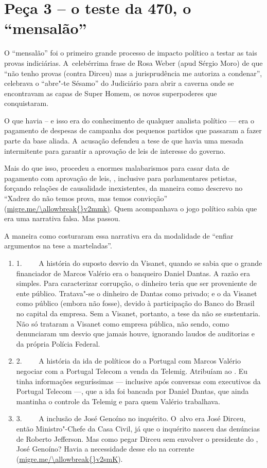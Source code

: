 \section{Peça 3 -- o teste da  470, o ``mensalão''}

O ``mensalão'' foi o primeiro grande processo de impacto político a
testar as tais provas indiciárias. A~celebérrima frase de Rosa Weber
(apud Sérgio Moro) de que ``não tenho provas (contra Dirceu) mas a
jurisprudência me autoriza a condenar'', celebrava o ``abre"-te Sésamo''
do Judiciário para abrir a caverna onde se encontravam as capas de Super
Homem, os novos superpoderes que conquistaram.

O que havia -- e isso era do conhecimento de qualquer analista político
--- era o pagamento de despesas de campanha dos pequenos partidos que
passaram a fazer parte da base aliada. A~acusação defendeu a tese de que
havia uma mesada intermitente para garantir a aprovação de leis de
interesse do governo.

Mais do que isso, procedeu a enormes malabarismos para casar data de
pagamento com aprovação de leis, , inclusive para parlamentares
petistas, forçando relações de causalidade inexistentes, da maneira como
descrevo no ``Xadrez do não temos prova, mas temos convicção''
(\url{migre.me/\allowbreak{}v2mmk)}. Quem acompanhava o jogo político sabia
que era uma narrativa falsa. Mas passou.

A maneira como costuraram essa narrativa era da modalidade de ``enfiar
argumentos na tese a marteladas''.

\begin{enumerate}
\itemsep1pt\parskip0pt
\item
  1.~~~~ A história do suposto desvio da Visanet, quando se sabia que o
  grande financiador de Marcos Valério era o banqueiro Daniel Dantas. A
  razão era simples. Para caracterizar corrupção, o dinheiro teria que
  ser proveniente de ente público. Tratava"-se o dinheiro de Dantas como
  privado; e o da Visanet como público (embora não fosse), devido à
  participação do Banco do Brasil no capital da empresa. Sem a Visanet,
  portanto, a tese da  não se sustentaria. Não só trataram a Visanet
  como empresa pública, não sendo, como denunciaram um desvio que jamais
  houve, ignorando laudos de auditorias e da própria Polícia Federal.
\item
  2.~~~~ A história da ida de políticos do  a Portugal com Marcos
  Valério negociar com a Portugal Telecom a venda da Telemig. Atribuíam
  ao . Eu tinha informações seguríssimas --- inclusive após conversas
  com executivos da Portugal Telecom \mbox{---,} que a ida foi bancada por
  Daniel Dantas, que ainda mantinha o controle da Telemig e para quem
  Valério trabalhava.
\item
  3.~~~~ A inclusão de José Genoíno no inquérito. O~alvo era José
  Dirceu, então Ministro"-Chefe da Casa Civil, já que o inquérito nasceu
  das denúncias de Roberto Jefferson. Mas como pegar Dirceu sem envolver
  o presidente do , José Genoíno? Havia a necessidade desse elo na
  corrente (\url{migre.me/\allowbreak{}v2smK}).
\end{enumerate}

